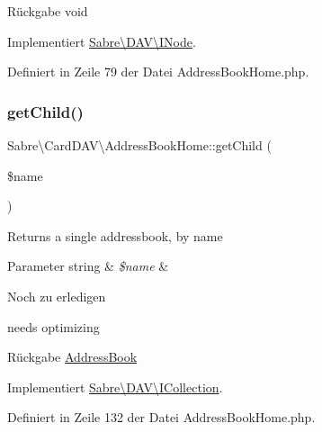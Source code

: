 \begin{DoxyReturn}{Rückgabe}
void 
\end{DoxyReturn}


Implementiert \mbox{\hyperlink{interface_sabre_1_1_d_a_v_1_1_i_node_a72cd0ee4e36dfced2b0412d14dbd73e6}{Sabre\textbackslash{}\+D\+A\+V\textbackslash{}\+I\+Node}}.



Definiert in Zeile 79 der Datei Address\+Book\+Home.\+php.

\mbox{\label{class_sabre_1_1_card_d_a_v_1_1_address_book_home_ae7b3aaf05451966e44a11ce81f97ea28}} 
\subsubsection{\texorpdfstring{get\+Child()}{getChild()}}
{\footnotesize\ttfamily Sabre\textbackslash{}\+Card\+D\+A\+V\textbackslash{}\+Address\+Book\+Home\+::get\+Child (\begin{DoxyParamCaption}\item[{}]{\$name }\end{DoxyParamCaption})}

Returns a single addressbook, by name


\begin{DoxyParams}[1]{Parameter}
string & {\em \$name} & \\
\hline
\end{DoxyParams}
\begin{DoxyRefDesc}{Noch zu erledigen}
\item[\mbox{\hyperlink{todo__todo000003}{Noch zu erledigen}}]needs optimizing \end{DoxyRefDesc}
\begin{DoxyReturn}{Rückgabe}
\mbox{\hyperlink{class_sabre_1_1_card_d_a_v_1_1_address_book}{Address\+Book}} 
\end{DoxyReturn}


Implementiert \mbox{\hyperlink{interface_sabre_1_1_d_a_v_1_1_i_collection_a09f82b07550611752abb149f468b89c2}{Sabre\textbackslash{}\+D\+A\+V\textbackslash{}\+I\+Collection}}.



Definiert in Zeile 132 der Datei Address\+Book\+Home.\+php.

